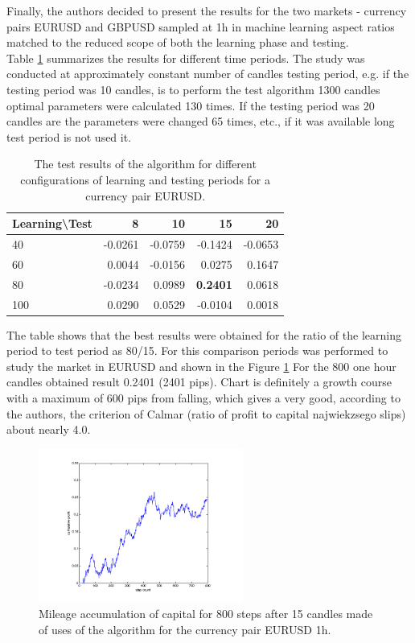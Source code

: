 \documentclass[runningheads,a4paper]{llncs}
\begin{document}
Finally, the authors decided to present the results for the two markets - currency pairs EURUSD and GBPUSD sampled at 1h in machine learning aspect ratios matched to the reduced scope of both the learning phase and testing.\\

Table \ref{tab:tab1} summarizes the results for different time periods. The study was conducted at approximately constant number of candles testing period, e.g. if the testing period was 10 candles, is to perform the test algorithm 1300 candles optimal parameters were calculated 130 times. If the testing period was 20 candles are the parameters were changed 65 times, etc., if it was available long test period is not used it.

\begin{table}[h!]
\centering
\caption{The test results of the algorithm for different configurations of learning and testing periods for a currency pair EURUSD.}
\label{tab:tab1}
\begin{tabular}{|l|r|r|r|r|} \hline
Learning\textbackslash Test &	8	 &	10 &		15	 &	20 \\ \hline
40 &		-0.0261 &		-0.0759	 &	-0.1424	 &	-0.0653 \\ \hline
60 &		0.0044 &		-0.0156 &		0.0275 &		0.1647 \\ \hline
80 &		-0.0234 &		0.0989 &		\textbf{0.2401} &		0.0618 \\ \hline
100	 &	0.0290 &		0.0529 &		-0.0104	 &	0.0018 \\ \hline
\end{tabular}
\end{table}
\FloatBarrier

The table shows that the best results were obtained for the ratio of the learning period to test period as 80/15. For this comparison periods was performed to study the market in EURUSD and shown in the Figure \ref{fig:fig8} For the 800 one hour candles obtained result 0.2401 (2401 pips). Chart is definitely a growth course with a maximum of 600 pips from falling, which gives a very good, according to the authors, the criterion of Calmar (ratio of profit to capital najwiekzsego slips) about nearly 4.0.\\

\begin{figure}[h!]
\centering
\includegraphics[width = 0.6\textwidth]{figures/rys8.png}
\caption{Mileage accumulation of capital for 800 steps after 15 candles made of uses of the algorithm for the currency pair EURUSD 1h.}
\label{fig:fig8}
\end{figure}
\FloatBarrier
\end{document}
